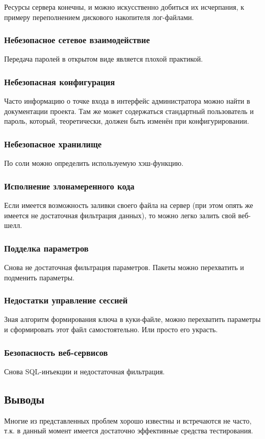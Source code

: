 Ресурсы сервера конечны, и можно искусственно добиться их исчерпания, к примеру переполнением дискового накопителя лог-файлами.

\subsubsection{Небезопасное сетевое взаимодействие}

Передача паролей в открытом виде является плохой практикой.

\subsubsection{Небезопасная конфигурация}

Часто информацию о точке входа в интерфейс администратора можно найти в документации проекта. Там же может содержаться стандартный пользователь и пароль, который, теоретически, должен быть изменён при конфигурировании.

\subsubsection{Небезопасное хранилище}

По соли можно определить используемую хэш-функцию.

\subsubsection{Исполнение злонамеренного кода}

Если имеется возможность заливки своего файла на сервер (при этом опять же имеется не достаточная фильтрация данных), то можно легко залить свой веб-шелл.

\subsubsection{Подделка параметров}

Снова не достаточная фильтрация параметров. Пакеты можно перехватить и подменить параметры.

\subsubsection{Недостатки управление сессией}

Зная алгоритм формирования ключа в куки-файле, можно перехватить параметры и сформировать этот файл самостоятельно. Или просто его украсть.

\subsubsection{Безопасность веб-сервисов}

Снова SQL-инъекции и недостаточная фильтрация.

\subsection{Выводы}

Многие из представленных проблем хорошо известны и встречаются не часто, т.к. в данный момент имеется достаточно эффективные средства тестирования.
